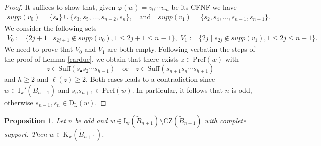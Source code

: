 \documentclass{amsart}
\newcommand{\B}{{\widetilde{B}_{n+1}}}
\newcommand{\ld}{{\mathrm{D}_{\mathrm{L}}}}
\newcommand{\s}{{s_{\bullet}}}
\newcommand{\su}{\mathrm{Suff}}
\newcommand{\pr}{\mathrm{Pref}}
\newcommand{\zz}{\mathrm{CZ}}
\newcommand{\carw}{\mathrm{K_w}}
\newcommand{\IR}{\mathrm{I_w}}
\newcommand{\IRc}{\mathrm{I_w'}}
\newcommand{\nmap}{\varphi}
\newtheorem{Proposition}[Theorem]{Proposition}
\theoremstyle{definition}
\begin{document}
\begin{proof}
    It suffices to show that, given $\nmap(w)=v_0\cdots v_m$ be its CFNF we have
    \begin{align*}
        supp(v_0)=\{\s\} \cup \{s_3, s_5, \ldots, s_{n-2}, s_n\},\quad\mbox{and} \quad
        supp(v_1)=\{s_2, s_4, \ldots, s_{n-1}, s_{n+1}\}. 
    \end{align*}
    We consider the following sets
    \begin{align*}
    V_0:=\{2j+1 \mid s_{2j+1}\notin supp(v_0),  1 \leq 2j+1 \leq n-1\},\,\, V_1:=\{ 2j \mid s_{2j}\notin supp(v_1), 1\le 2j\le n-1\}. 
\end{align*}
We need to prove that $V_0$ and $V_1$ are both empty. Following verbatim the steps of the proof of Lemma \ref{cardue}, we obtain that there exists $z\in \pr(w)$ with
\[z\in \su(\s s_2\cdots s_{h-1}) \quad \mbox{or} \quad z\in \su(s_{n+1} s_n\cdots s_{h+1})\] and $h\ge 2$ and $\ell(z)\ge 2$. Both cases leads to a contradiction since $w\in \IRc(\B)$ and $s_{n}s_{n+1}\in \pr(w)$. In particular, it follows that $n$ is odd, otherwise $s_{n-1},s_{n}\in \ld(w)$. 

\end{proof} 




\begin{Proposition}
\label{proposition:weakcara}
Let $n$ be odd and $w\in \IR(\B) \setminus \zz(\B)$ with complete support. Then $w\in \carw(\B)$. 
\end{Proposition}
\end{document}
